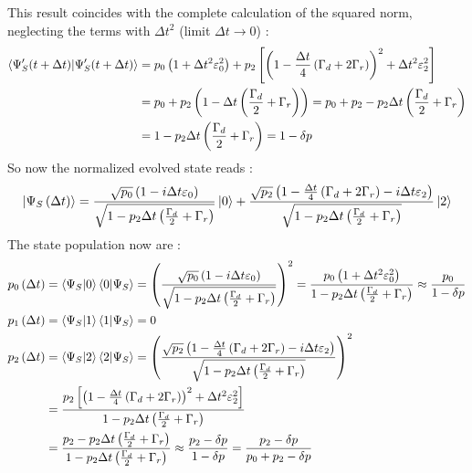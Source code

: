 \documentclass[a4paper,12pt]{article}
\begin{document}
	This result coincides with the complete calculation of the squared norm, neglecting the terms with $ \Delta t^{2} $ (limit $ \Delta t \rightarrow 0 $) : 
	\begin{align}
		\braket{\Psi_{S}' (t +\Delta t) | \Psi_{S}' (t +\Delta t)} &= p_{0} \left( 1 + \Delta t^{2} \varepsilon_{0}^{2}\right) + p_{2} \left[ \left( 1 -\frac{\Delta t}{4} \left(\Gamma_{d} + 2 \Gamma_{r} \right) \right)^{2} + \Delta t^{2} \varepsilon_{2}^{2} \right] \notag \\
		&= p_{0} + p_{2} \left( 1 - \Delta t \left( \frac{\Gamma_{d}}{2} + \Gamma_{r} \right) \right) = p_{0} + p_{2} - p_{2} \Delta t \left( \frac{\Gamma_{d}}{2} + \Gamma_{r} \right) \notag \\
		&= 1 - p_{2} \Delta t \left( \frac{\Gamma_{d}}{2} + \Gamma_{r} \right) = 1 -\delta p
	\end{align}
	So now the normalized evolved state reads : 
	\begin{equation}
		\ket{\Psi_{S} \left(\Delta t\right)} = \frac{\sqrt{p_{0}} \left( 1 -  i \Delta t \varepsilon_{0} \right)}{\sqrt{1 -  p_{2} \Delta t \left( \frac{\Gamma_{d}}{2} + \Gamma_{r} \right)} } \ket{0} + \frac{\sqrt{p_{2}} \left( 1 - \frac{\Delta t}{4} \left(\Gamma_{d} + 2 \Gamma_{r}\right) - i \Delta t \varepsilon_{2} \right)}{\sqrt{1 - p_{2} \Delta t \left( \frac{\Gamma_{d}}{2} + \Gamma_{r} \right)}} \ket{2}
	\end{equation}
	The state population now are : 
	\begin{align}
		p_{0} \left(\Delta t\right) &= \braket{\Psi_{S} | 0}   \braket{0 | \Psi_{S}} = \left(\frac{\sqrt{p_{0}} \left( 1 -  i \Delta t \varepsilon_{0} \right)}{\sqrt{1 -  p_{2} \Delta t \left( \frac{\Gamma_{d}}{2} + \Gamma_{r} \right)} }\right)^{2} = \frac{p_{0} \left( 1 + \Delta t^{2} \varepsilon_{0}^{2} \right)}{1 -  p_{2} \Delta t \left( \frac{\Gamma_{d}}{2} + \Gamma_{r} \right)} \approx \frac{p_{0}}{1 - \delta p} \\
		p_{1} \left(\Delta t\right) &= \braket{\Psi_{S} | 1}   \braket{1 | \Psi_{S}} = 0 \\
		p_{2} \left(\Delta t\right) &= \braket{\Psi_{S} | 2}   \braket{2 | \Psi_{S}} = \left(\frac{\sqrt{p_{2}} \left( 1 - \frac{\Delta t}{4} \left(\Gamma_{d} + 2 \Gamma_{r}\right) - i \Delta t \varepsilon_{2} \right)}{\sqrt{1 -  p_{2} \Delta t \left( \frac{\Gamma_{d}}{2} + \Gamma_{r} \right)} }\right)^{2} \notag \\
		&= \frac{p_{2} \left[ \left( 1 - \frac{\Delta t}{4} \left(\Gamma_{d} + 2 \Gamma_{r}\right) \right)^{2} + \Delta t^{2} \varepsilon_{2}^{2} \right]}{1 -  p_{2} \Delta t \left( \frac{\Gamma_{d}}{2} + \Gamma_{r} \right)} \notag \\
		&= \frac{p_{2} - p_{2} \Delta t \left(\frac{\Gamma_{d}}{2} + \Gamma_{r}\right)}{1 -  p_{2} \Delta t \left( \frac{\Gamma_{d}}{2} + \Gamma_{r} \right)} \approx \frac{p_{2} - \delta p}{1 - \delta p} = \frac{p_{2} - \delta p}{p_{0} + p_{2} - \delta p}
	\end{align}
	
\end{document}
